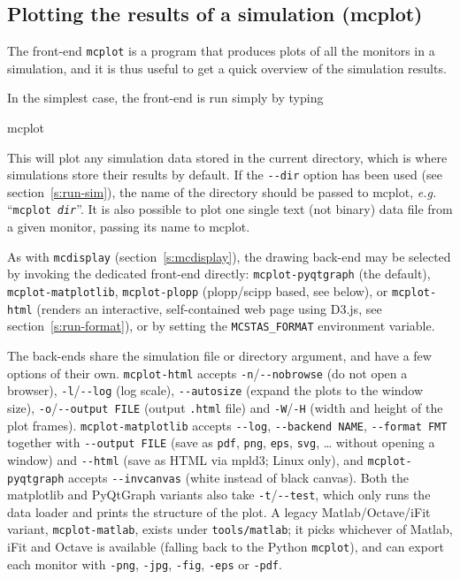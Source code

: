 \subsection{Plotting the results of a simulation (mcplot)}
\label{s:mcplot}

The front-end \verb+mcplot+ is a program that produces
plots of all the monitors in a simulation, and it is thus useful to get
a quick overview of the simulation results.

In the simplest case, the front-end is run simply by typing
\begin{bash}
    mcplot
\end{bash}
This will plot any simulation data stored in the current directory, which is
where simulations store their results by default. If the \verb+--dir+
option has been used (see section~\ref{s:run-sim}), the name of
the directory should be passed to mcplot, {\em e.g.} ``\texttt{mcplot
  \textit{dir}}''.  It is also possible to plot
one single text (not binary) data file from a given monitor, passing its name to
mcplot.

As with \texttt{mcdisplay} (section~\ref{s:mcdisplay}), the drawing back-end
may be selected by invoking the dedicated front-end directly:
\verb+mcplot-pyqtgraph+ (the default), \verb+mcplot-matplotlib+, \verb+mcplot-plopp+ (plopp/scipp based, see below), or
\verb+mcplot-html+ (renders an interactive, self-contained web page using
D3.js, see section~\ref{s:run-format}), or by setting the
\verb+MCSTAS_FORMAT+ environment variable.

The back-ends share the simulation file or directory argument, and have a few
options of their own. \verb+mcplot-html+ accepts \verb+-n+/\verb+--nobrowse+ (do
not open a browser), \verb+-l+/\verb+--log+ (log scale), \verb+--autosize+
(expand the plots to the window size), \verb+-o+/\verb+--output FILE+ (output
\texttt{.html} file) and \verb+-W+/\verb+-H+ (width and height of the plot
frames). \verb+mcplot-matplotlib+ accepts \verb+--log+, \verb+--backend NAME+,
\verb+--format FMT+ together with \verb+--output FILE+ (save as
\texttt{pdf}, \texttt{png}, \texttt{eps}, \texttt{svg}, \ldots{} without opening
a window) and \verb+--html+ (save as HTML via mpld3; Linux only), and
\verb+mcplot-pyqtgraph+ accepts \verb+--invcanvas+ (white instead of black
canvas). Both the matplotlib and PyQtGraph variants also take \verb+-t+/\verb+--test+,
which only runs the data loader and prints the structure of the plot.
A legacy Matlab/Octave/iFit variant, \verb+mcplot-matlab+, exists under
\texttt{tools/matlab}; it picks whichever of Matlab, iFit and Octave is
available (falling back to the Python \verb+mcplot+), and can export each
monitor with \texttt{-png}, \texttt{-jpg}, \texttt{-fig}, \texttt{-eps} or
\texttt{-pdf}.

